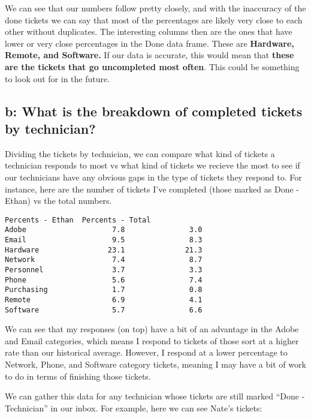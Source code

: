 \documentclass[11pt]{article}
\begin{document}
    We can see that our numbers follow pretty closely, and with the
inaccuracy of the done tickets we can say that most of the percentages
are likely very close to each other without duplicates. The interesting
columns then are the ones that have lower or very close percentages in
the Done data frame. These are \textbf{Hardware, Remote, and Software.}
If our data is accurate, this would mean that \textbf{these are the
tickets that go uncompleted most often}. This could be something to look
out for in the future.

    \hypertarget{b-what-is-the-breakdown-of-completed-tickets-by-technician}{%
\subsection{b: What is the breakdown of completed tickets by
technician?}\label{b-what-is-the-breakdown-of-completed-tickets-by-technician}}


    Dividing the tickets by technician, we can compare what kind of tickets
a technician responds to most vs what kind of tickets we recieve the
most to see if our technicians have any obvious gaps in the type of
tickets they respond to. For instance, here are the number of tickets
I've completed (those marked as Done - Ethan) vs the total numbers.


    \begin{Verbatim}[commandchars=\\\{\}]
            Percents - Ethan  Percents - Total
Adobe                    7.8               3.0
Email                    9.5               8.3
Hardware                23.1              21.3
Network                  7.4               8.7
Personnel                3.7               3.3
Phone                    5.6               7.4
Purchasing               1.7               0.8
Remote                   6.9               4.1
Software                 5.7               6.6
    \end{Verbatim}

    We can see that my responses (on top) have a bit of an advantage in the
Adobe and Email categories, which means I respond to tickets of those
sort at a higher rate than our historical average. However, I respond at
a lower percentage to Network, Phone, and Software category tickets,
meaning I may have a bit of work to do in terms of finishing those
tickets.

    We can gather this data for any technician whose tickets are still
marked ``Done - Technician'' in our inbox. For example, here we can see
Nate's tickets:
\end{document}

